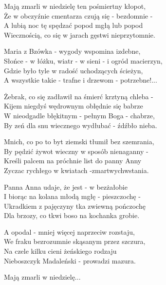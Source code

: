 \begin{text}
    \vin Mają zmarli w niedzielę ten pośmiertny kłopot,\\
    \vin Że w obczyźnie cmentarza czują się - bezdomnie -\\
    \vin A lubią noc tę spędzać popod mgłą lub popod\\
    \vin Wiecznością, co się w jarach gęstwi nieprzytomnie.

    Maria z Bzówka - wygody wspomina izdebne,\\
    Słońce - w łóżku, wiatr - w sieni - i ogród macierzyn,\\
    Gdzie było tyle w radość uchodzących ścieżyn,\\
    A wszystkie takie - trafne i drzewom - potrzebne!...

    Żebrak, co się zadławił na śmierć krztyną chleba -\\
    Kijem niegdyś wędrownym obłędnie się babrze\\
    W nieodgadle błękitnym - pełnym Boga - chabrze,\\
    By zeń dla snu wiecznego wydłubać - źdźbło nieba.

    Mnich, co po to byt ziemski tłumił bez szemrania,\\
    By pędzić żywot wieczny w sposób nienaganny -\\
    Kreśli palcem na próchnie list do panny Anny\\
    Zyczac rychłego w kwiatach -zmartwychwstania.

    Panna Anna udaje, że jest - w bezżałobie\\
    I biorąc na kolana młodą mgłę - pieszczochę -\\
    Ukradkiem z pajęczyny tka zwiewną pończochę\\
    Dla brzozy, co tkwi boso na kochanka grobie.

    A opodal - mniej więcej naprzeciw rozstaju,\\
    We fraku bezrozumnie skąsanym przez szczura,\\
    Na czele kilku cieni żeńskiego rodzaju\\
    Nieboszczyk Madaleński - prowadzi mazura.
    
    \vin Mają zmarli w niedzielę...
\end{text}
